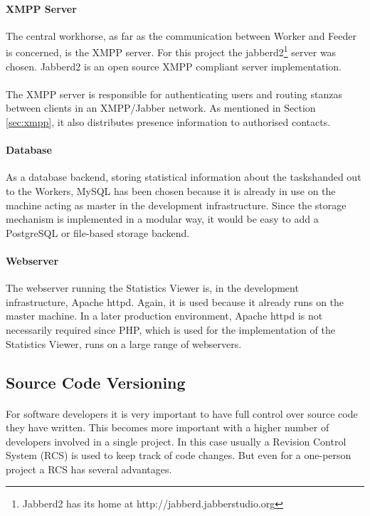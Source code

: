 \paragraph{XMPP Server}
The central workhorse, as far as the communication between Worker and Feeder is concerned, is the XMPP server. For this project the jabberd2\footnote{Jabberd2 has its home at http://jabberd.jabberstudio.org} server was chosen. Jabberd2 is an open source XMPP compliant server implementation.
\paragraph{}
The XMPP server is responsible for authenticating users and routing stanzas between clients in an XMPP/Jabber network. As mentioned in Section \ref{sec:xmpp}, it also distributes presence information to authorised contacts.

\paragraph{Database}
As a database backend, storing statistical information about the taskshanded out to the Workers, MySQL has been chosen because it is already in use on the machine acting as master in the development infrastructure. Since the storage mechanism is implemented in a modular way, it would be easy to add a PostgreSQL or file-based storage backend.

\paragraph{Webserver}
The webserver running the Statistics Viewer is, in the development infrastructure, Apache httpd. Again, it is used because it already runs on the master machine. In a later production environment, Apache httpd is not necessarily required since PHP, which is used for the implementation of the Statistics Viewer, runs on a large range of webservers.


\subsection{Source Code Versioning}
\paragraph{}
For software developers it is very important to have full control over source code they have written. This becomes more important with a higher number of developers involved in a single project. In this case usually a Revision Control System (RCS) is used to keep track of code changes. But even for a one-person project a RCS has several advantages.

